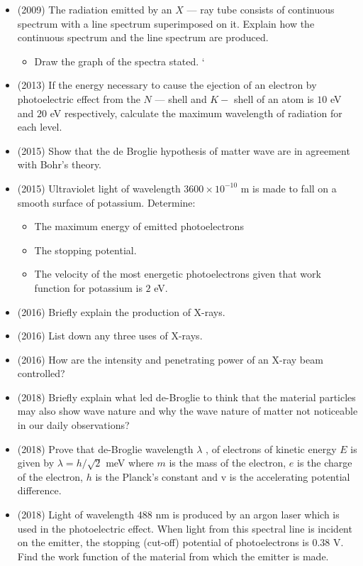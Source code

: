 \documentclass{article}
\begin{document}
\begin{itemize}
\begin{itemize}
\end{itemize}
\item (2009)  The radiation emitted by an $ X$ — ray tube consists of continuous spectrum with a line spectrum superimposed on it. Explain how the continuous spectrum and the line spectrum are produced.
 \begin{itemize}
\item Draw the graph of the spectra stated. ‘
\end{itemize}
\item (2013)  If the energy necessary to cause the ejection of an electron by photoelectric effect from the $ N$ — shell and $ K-$ shell of an atom is $ 10$ eV and $ 20$ eV respectively, calculate the maximum wavelength of radiation for each level.
\item (2015)  Show that the de Broglie hypothesis of matter wave are in agreement with Bohr’s theory.
\item (2015)  Ultraviolet light of wavelength $ 3600 \times 10^{-10}$ m is made to fall on a smooth surface of potassium. Determine:
 \begin{itemize}
\item The maximum energy of emitted photoelectrons
\item The stopping potential.
\item The velocity of the most energetic photoelectrons given that work function for potassium is $ 2$ eV.
\end{itemize}
\item (2016)  Briefly explain the production of X-rays.
\item (2016)  List down any three uses of X-rays.
\item (2016)  How are the intensity and penetrating power of an X-ray beam controlled?
\item (2018)  Briefly explain what led de-Broglie to think that the material particles may also show wave nature and why the wave nature of matter not noticeable in our daily observations? 
\item (2018)  Prove that de-Broglie wavelength $ \lambda $ , of electrons of kinetic energy $ E$ is given by $ \lambda = h/ \sqrt{2}$ meV  where $ m$ is the mass of the electron, $ e$ is the charge of the electron, $ h$ is the Planck’s constant and v is the accelerating potential difference. 
\item (2018)  Light of wavelength $ 488$ nm is produced by an argon laser which is used in the photoelectric effect. When light from this spectral line is incident on the emitter, the stopping (cut-off) potential of photoelectrons is $ 0.38$ V. Find the work function of the material from which the emitter is made. 

\end{itemize}
\end{document}
